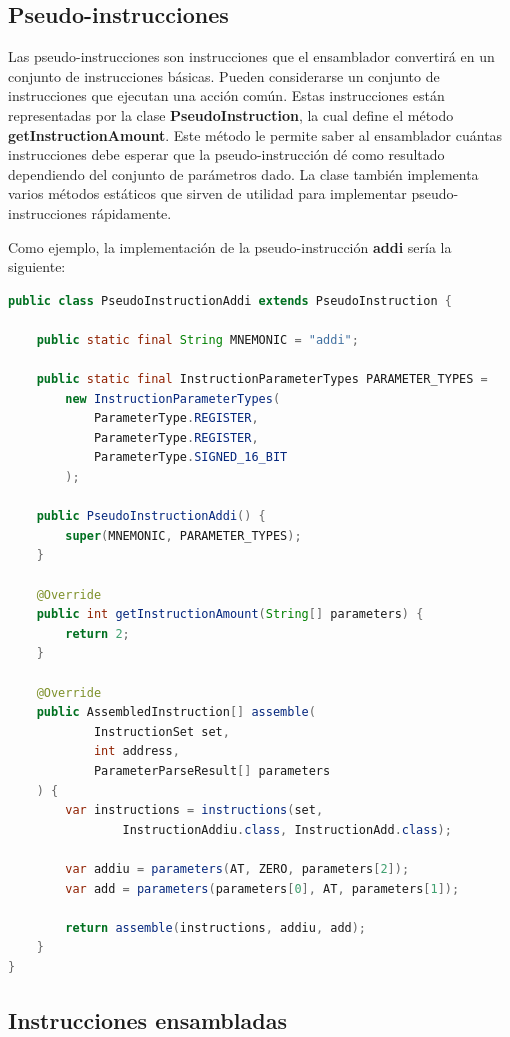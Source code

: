 \subsection{Pseudo-instrucciones}\label{subsec:pseudo-instrucciones}

Las pseudo-instrucciones son instrucciones que el ensamblador
convertirá en un conjunto de instrucciones básicas.
Pueden considerarse un conjunto de instrucciones que ejecutan una acción común.
Estas instrucciones están representadas por la clase
\textbf{PseudoInstruction},
la cual define el método \textbf{getInstructionAmount}.
Este método le permite saber al ensamblador cuántas instrucciones
debe esperar que la pseudo-instrucción dé como resultado dependiendo
del conjunto de parámetros dado.
La clase también implementa varios métodos estáticos que sirven
de utilidad para implementar pseudo-instrucciones rápidamente.

\noindent Como ejemplo, la implementación de la pseudo-instrucción
\textbf{addi} sería la siguiente:

\begin{lstlisting}[language=Java,style=java,frame=single,label={lst:pseudo-instruction}]
public class PseudoInstructionAddi extends PseudoInstruction {

    public static final String MNEMONIC = "addi";

    public static final InstructionParameterTypes PARAMETER_TYPES =
        new InstructionParameterTypes(
            ParameterType.REGISTER,
            ParameterType.REGISTER,
            ParameterType.SIGNED_16_BIT
        );

    public PseudoInstructionAddi() {
        super(MNEMONIC, PARAMETER_TYPES);
    }

    @Override
    public int getInstructionAmount(String[] parameters) {
        return 2;
    }

    @Override
    public AssembledInstruction[] assemble(
            InstructionSet set,
            int address,
            ParameterParseResult[] parameters
    ) {
        var instructions = instructions(set,
                InstructionAddiu.class, InstructionAdd.class);

        var addiu = parameters(AT, ZERO, parameters[2]);
        var add = parameters(parameters[0], AT, parameters[1]);

        return assemble(instructions, addiu, add);
    }
}
\end{lstlisting}

\subsection{Instrucciones ensambladas}\label{subsec:instrucciones-ensambladas}

